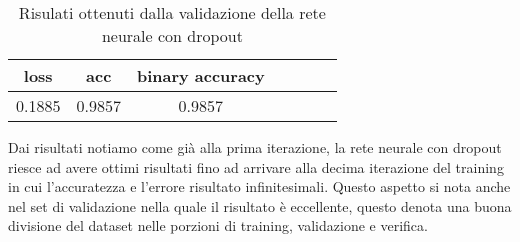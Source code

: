 \renewcommand{\arraystretch}{1}
\renewcommand{\arraystretch}{1.4}
\begin{table}[H]
	\begin{center}
		\begin{tabular}{|c|c|c|c|c|c|c|}
			\hline
			 \textbf{loss} & \textbf{acc} & \textbf{binary accuracy} \\ \hline
			0.1885  & 0.9857 & 0.9857 \\ \hline
		\end{tabular}
		\caption{Risulati ottenuti dalla validazione della rete neurale con dropout\label{}}
	\end{center}
\end{table}
\renewcommand{\arraystretch}{1}
Dai risultati notiamo come già alla prima iterazione, la rete neurale con dropout riesce ad avere ottimi risultati fino ad arrivare alla decima iterazione del training in cui l'accuratezza e l'errore risultato infinitesimali.
Questo aspetto si nota anche nel set di validazione nella quale il risultato è eccellente, questo denota una buona divisione del dataset nelle porzioni di training, validazione e verifica.

